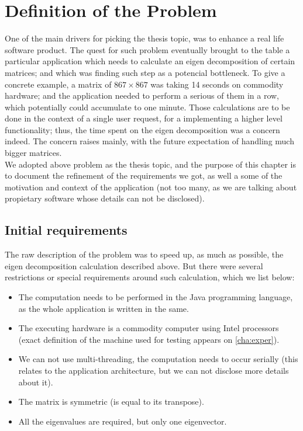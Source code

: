 \chapter{Definition of the Problem}

One of the main drivers for picking the thesis topic, was to enhance a
real life software product. The quest for such problem eventually
brought to the table a particular application which needs to calculate
an eigen decomposition of certain matrices; and which was finding such step
as a potencial bottleneck. To give a concrete example, a matrix of  $867
\times 867$ was taking 14 seconds on commodity hardware; and the
application needed to perform a serious of them in a row, which
potentially could accumulate to one minute. Those calculations are
to be done in the context of a single user request, for a implementing
a higher level functionality; thus, the time spent on the eigen
decomposition was a concern indeed. The concern raises mainly, with
the future expectation of handling much bigger matrices. \\

We adopted above problem as the thesis topic, and the purpose of this
chapter is to document the refinement of the
requirements we got, as well a some of the motivation and context of
the application (not too many, as we are talking about propietary
software whose details can not be disclosed). 

\section{Initial requirements}

The raw description of the problem was to speed up, as much as
possible, the eigen decomposition calculation described above. But
there were several restrictions or special requirements around such
calculation, which we list below:

\begin{itemize}
  \item The computation needs to be performed in the Java programming
    language, as the whole application is written in the same. \\
  \item The executing hardware is a commodity computer using Intel
    processors (exact definition of the machine used for testing
    appears on \cref{cha:exper}).
  \item We can not use multi-threading, the computation needs to occur
    serially (this relates to the application architecture, but we can
    not disclose more details about it). \\
  \item The matrix is symmetric (is equal to its transpose). \\
  \item All the eigenvalues are required, but only one eigenvector.
\end{itemize}
\hfill

